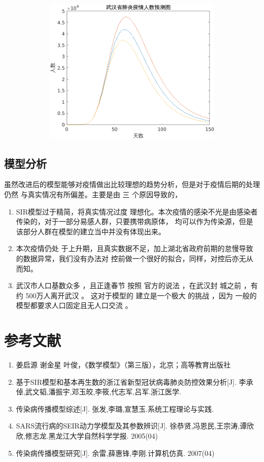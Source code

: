 \documentclass{article}
\begin{document}
\begin{enumerate}
\begin{enumerate}
 \begin{figure}[h!]
                \centering
                \includegraphics[width=15cm,height=7cm]{10.png}
                \end{figure} 
\end{enumerate}
\end{enumerate}           

\subsection{模型分析}
虽然改进后的模型能够对疫情做出比较理想的趋势分析，但是对于疫情后期的处理仍然
与真实情况有所偏差。主要是由 三 个原因导致的，
\begin{enumerate}
  \item SIR模型过于精简，将真实情况过度
理想化。本次疫情的感染不光是由感染者传染的，对于一部分易感人群，只要携带病原体，
均可以作为传染源，但是该部分人群在模型的建立当中并没有体现出来。
\item 本次疫情仍处
于上升期，且真实数据不足，加上湖北省政府前期的怠慢导致的数据异常，我们没有办法对
控前做一个很好的拟合，同样，对控后亦无从而知。 
\item 武汉市人口基数众多 ，且正逢春节
按照 官方的说法 ，在武汉封 城之前 ，有约 500万人离开武汉 。 这对于模型的 建立是一个极大
的挑战 ，因为 一般的模型都要求人口固定且无人口交流 。
\end{enumerate}
\section{参考文献}
\begin{enumerate}
\item 姜启源 谢金星 叶俊，《数学模型》（第三版），北京；高等教育出版社
\item 基于SIR模型和基本再生数的浙江省新型冠状病毒肺炎防控效果分析[J]. 李承倬,武文韬,潘振宇,邓玉皎,李筱,代志军,吕军.浙江医学.
\item 传染病传播模型综述[J]. 张发,李璐,宣慧玉.系统工程理论与实践. 
\item SARS流行病的SEIR动力学模型及其参数辨识[J]. 徐恭贤,冯恩民,王宗涛,谭欣欣,修志龙.黑龙江大学自然科学学报. 2005(04)
\item 传染病传播模型研究[J]. 余雷,薛惠锋,李刚.计算机仿真. 2007(04)
\end{enumerate}
\end{document}
